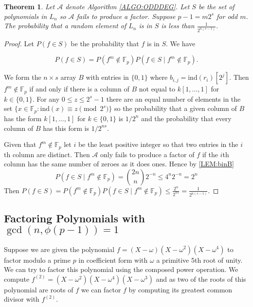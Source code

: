 \documentclass{article}
\newcounter{dummy} \numberwithin{dummy}{section}
\theoremstyle{plain}
\newtheorem{thm}[dummy]{Theorem}
\theoremstyle{definition}
\def\Fp {{ \mathbb{F} _ {p} }}
\def\mcA  {{ \mathcal{A}}}
\def\ind {{ \mathrm{ind} }}
\begin{document}
		\begin{thm} 
		    Let $\mcA$ denote Algorithm \ref{ALGO:ODDDEG}. Let $S$ be the set of polynomials in $L_n$ so $\mcA$ fails to produce a factor. Suppose $p-1=m2^s$ for odd $m$. The probability that a random element of $L_n$ is in $S$ is less than $ \frac{1} {2^{n(s-1)}} $.  
		\end{thm}
		
		\begin{proof}
		    Let $P(f \in S)$ be the probability that $f$ is in $S$. We have 
				
				\[ P(f \in S)=P(f^m \not\in \Fp)P(f \in S \mid f^m \not\in \Fp). \] 
				
				\noindent We form the $n \times s$ array $B$ with entries in $\{0,1 \}$ where $b_{i,j}=\ind(r_i)[2^j]$. Then $f^m \not\in \Fp$ if and only if there is a column of $B$ not equal to $k[1,\ldots,1]$ for $k \in \{0,1 \}$. For any $0 \leq z \leq 2^s-1$ there are an equal number of elements in the set $\{ x \in \Fp : \ind(x) \equiv z \pmod {2^s} \}$ so the probability that a given column of $B$ has the form $k[1,\ldots,1]$ for $k \in \{0,1 \}$ is $1/2^n$ and the probability that every column of $B$ has this form is $1/2^{ns}$.
				
				Given that $f^m \not\in \Fp$ let $i$ be the least positive integer so that two entries in the $i$th column are distinct. Then $\mcA$ only fails to produce a factor of $f$ if the $i$th column has the same number of zeroes as it does ones. Hence by \ref{LEM:binB}
				\[ P(f \in S \mid f^m \not\in \Fp)=\binom{2n}{n} 2^{-n} \leq 4^n2^{-n}=2^n \]
				Then $P(f \in S) = P(f^m \not\in \Fp)P(f \in S \mid f^m \not\in \Fp) \leq \frac{2^n}{2^{ns}} =\frac{1} {2^{n(s-1)}}.$
		\end{proof}
		
    \subsection{Factoring Polynomials with $\gcd(n,\phi(p-1))=1$  }
		\label{SEC:CoDeg}
		
		Suppose we are given the polynomial $f=(X-\omega)(X-\omega^2)(X-\omega^4)$ to factor modulo a prime $p$ in coefficient form with $\omega$ a primitive 5th root of unity. We can try to factor this polynomial using the composed power operation. We compute $f^{(2)}=(X-\omega^2)(X-\omega^4)(X-\omega^3)$ and as two of the roots of this polynomial are roots of $f$ we can factor $f$ by computing its greatest common divisor with $f^{(2)}$.
		
\end{document}
